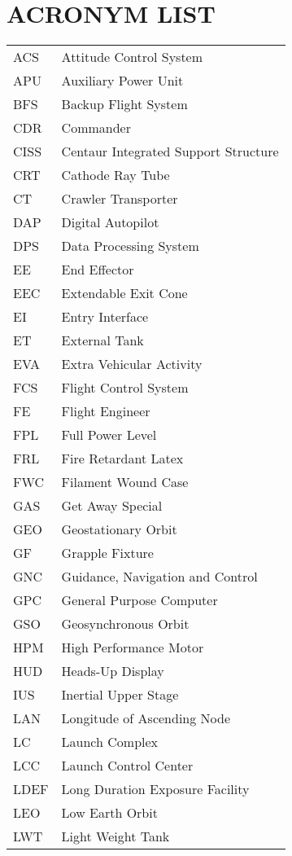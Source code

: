 \documentclass[Space_Shuttle_Vessel_Manual.tex]{subfiles}
\begin{document}
\section{ACRONYM LIST}
\label{sec:acronym-list}
\noindent
\begin{longtable}{l l }
ACS & Attitude Control System\\
APU & Auxiliary Power Unit\\
BFS & Backup Flight System\\
CDR & Commander\\
CISS & Centaur Integrated Support Structure\\
CRT & Cathode Ray Tube\\
CT & Crawler Transporter\\
DAP & Digital Autopilot\\
DPS & Data Processing System\\
EE & End Effector\\
EEC & Extendable Exit Cone\\
EI & Entry Interface\\
ET & External Tank\\
EVA & Extra Vehicular Activity\\
FCS & Flight Control System\\
FE & Flight Engineer\\
FPL & Full Power Level\\
FRL & Fire Retardant Latex\\
FWC & Filament Wound Case\\
GAS & Get Away Special\\
GEO & Geostationary Orbit\\
GF & Grapple Fixture\\
GNC & Guidance, Navigation and Control\\
GPC & General Purpose Computer\\
GSO & Geosynchronous Orbit\\
HPM & High Performance Motor\\
HUD & Heads-Up Display\\
IUS & Inertial Upper Stage\\
LAN & Longitude of Ascending Node\\
LC & Launch Complex\\
LCC & Launch Control Center\\
LDEF & Long Duration Exposure Facility\\
LEO & Low Earth Orbit\\
LWT & Light Weight Tank\\

\end{longtable}
\end{document}
